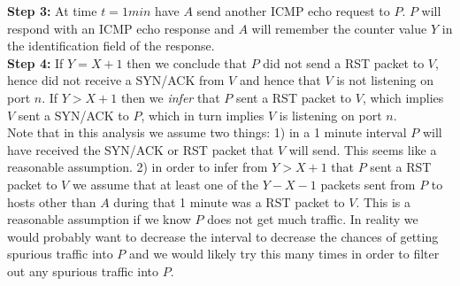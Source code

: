 \noindent\textbf{Step 3: } At time $t=1min$ have $A$ send another ICMP echo request to $P$. $P$ will respond with an ICMP echo response and $A$ will remember the counter value $Y$ in the identification field of the response.\\
\noindent\textbf{Step 4: } If $Y=X+1$ then we conclude that $P$ did not send a RST packet to $V$, hence did not receive a SYN/ACK from $V$ and hence that $V$ is not listening on port $n$. If $Y>X+1$ then we \textit{infer} that $P$ sent a RST packet to $V$, which implies $V$ sent a SYN/ACK to $P$, which in turn implies $V$ is listening on port $n$.\\

Note that in this analysis we assume two things: 1) in a 1 minute interval $P$ will have received the SYN/ACK or RST packet that $V$ will send. This seems like a reasonable assumption. 2) in order to infer from $Y>X+1$ that $P$ sent a RST packet to $V$ we assume that at least one of the $Y-X-1$ packets sent from $P$ to hosts other than $A$ during that 1 minute was a RST packet to $V$. This is a reasonable assumption if we know $P$ does not get much traffic. In reality we would probably want to decrease the interval to decrease the chances of getting spurious traffic into $P$ and we would likely try this many times in order to filter out any spurious traffic into $P$.
